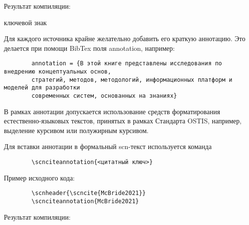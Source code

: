 \begin{textitemize}
	Результат компиляции:
	
	\begin{SCn}
		\begin{scnreltolist}{ключевой знак}
		\end{scnreltolist}
	\end{SCn}
	
	\item Для каждого источника крайне желательно добавить его краткую аннотацию. Это делается при помощи BibTex поля annotation, например:
	
	\begin{verbatim}
		annotation = {В этой книге представлены исследования по внедрению концептуальных основ,
		стратегий, методов, методологий, информационных платформ и моделей для разработки 
		современных систем, основанных на знаниях}
	\end{verbatim}
	
	В рамках аннотации допускается использование средств форматирования естественно-языковых текстов, принятых в рамках Стандарта OSTIS, например, выделение курсивом или полужирным курсивом.
	
	Для вставки аннотации в формальный scn-текст используется команда 
	
	\begin{verbatim}
		\scnciteannotation{<цитатный ключ>}
	\end{verbatim}
	
	Пример исходного кода:
	
	\begin{verbatim}
		\scnheader{\scncite{McBride2021}}
		\scnciteannotation{McBride2021}
	\end{verbatim}
	
	Результат компиляции:
	
	
\end{textitemize}

\newpage
